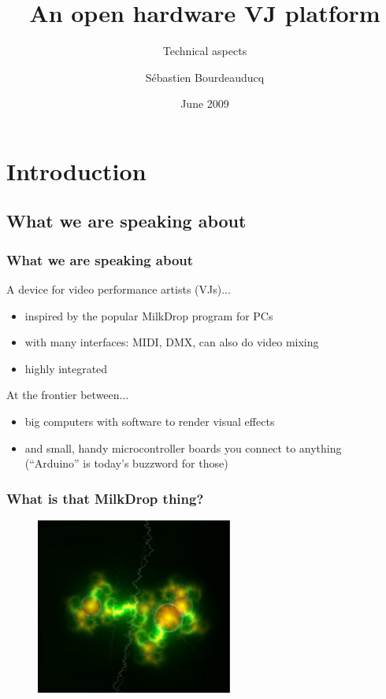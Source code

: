 \documentclass{beamer}
\title{An open hardware VJ platform}
\subtitle{Technical aspects}
\author{S\'ebastien Bourdeauducq}
\date{June 2009}
\begin{document}

\section{Introduction}
\subsection{What we are speaking about}
\frame
{
  \frametitle{What we are speaking about}
A device for video performance artists (VJs)...
  \begin{itemize}
  \item inspired by the popular MilkDrop program for PCs
  \item with many interfaces: MIDI, DMX, can also do video mixing
  \item highly integrated
  \end{itemize}

At the frontier between...
  \begin{itemize}
  \item big computers with software to render visual effects
  \item and small, handy microcontroller boards you connect to anything\\(``Arduino'' is today's buzzword for those)
  \end{itemize}
}

\frame
{
  \frametitle{What is that MilkDrop thing?}
  \begin{figure}[H]
  \includegraphics[height=58mm]{milkdrop1.eps}
  \end{figure}
}
\end{document}
